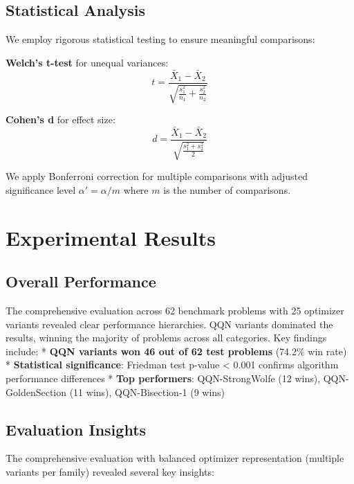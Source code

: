 \hypertarget{statistical-analysis}{%
\subsection{Statistical Analysis}\label{statistical-analysis}}

We employ rigorous statistical testing to ensure meaningful comparisons:

\textbf{Welch's t-test} for unequal variances:
\[t = \frac{\bar{X}_1 - \bar{X}_2}{\sqrt{\frac{s_1^2}{n_1} + \frac{s_2^2}{n_2}}}\]

\textbf{Cohen's d} for effect size:
\[d = \frac{\bar{X}_1 - \bar{X}_2}{\sqrt{\frac{s_1^2 + s_2^2}{2}}}\]

We apply Bonferroni correction for multiple comparisons with adjusted significance level \(\alpha' = \alpha / m\) where \(m\) is the number of comparisons.

\hypertarget{experimental-results}{%
\section{Experimental Results}\label{experimental-results}}

\hypertarget{overall-performance}{%
\subsection{Overall Performance}\label{overall-performance}}

The comprehensive evaluation across 62 benchmark problems with 25 optimizer variants revealed clear performance hierarchies. QQN variants dominated the results, winning the majority of problems across all categories. Key findings include:
* \textbf{QQN variants won 46 out of 62 test problems} (74.2\% win rate)
* \textbf{Statistical significance}: Friedman test p-value \textless{} 0.001 confirms algorithm performance differences
* \textbf{Top performers}: QQN-StrongWolfe (12 wins), QQN-GoldenSection (11 wins), QQN-Bisection-1 (9 wins)

\hypertarget{evaluation-insights}{%
\subsection{Evaluation Insights}\label{evaluation-insights}}

The comprehensive evaluation with balanced optimizer representation (multiple variants per family) revealed several key insights:

